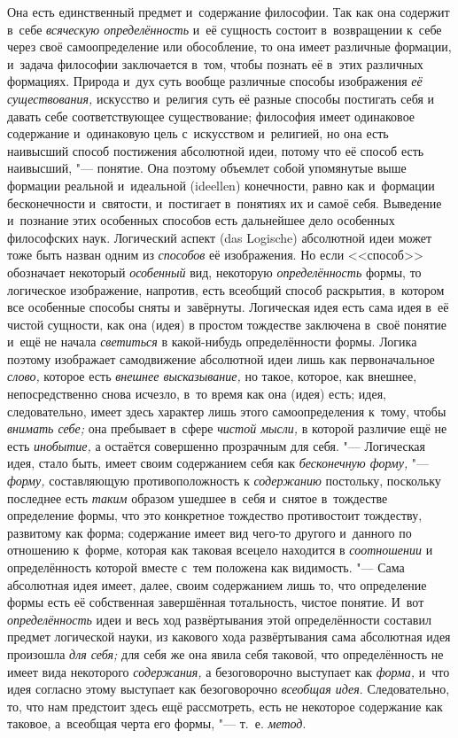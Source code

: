 Она есть единственный предмет и~содержание философии. Так как
она содержит в~себе {\em всяческую
определённость} и~её сущность состоит в~возвращении к~себе
через своё самоопределение или обособление, то она имеет различные
формации, и~задача философии заключается в~том, чтобы познать её в~этих
различных формациях. Природа и~дух суть вообще различные способы
изображения {\em её существования,}
искусство и~религия суть её разные способы постигать себя и
давать себе соответствующее существование; философия имеет одинаковое
содержание и~одинаковую цель с~искусством и~религией, но она
есть наивысший способ постижения абсолютной идеи, потому что её способ есть
наивысший, "--- понятие. Она поэтому объемлет собой упомянутые
выше формации реальной и~идеальной (ideellen) конечности,
равно как и~формации бесконечности и~святости, и~постигает в~понятиях их и
самоё себя. Выведение и~познание этих особенных способов есть дальнейшее
дело особенных философских наук. Логический аспект (das Logische)
абсолютной идеи может тоже быть назван одним из
{\em способов} её
изображения. Но если <<способ>> обозначает некоторый
{\em особенный} вид,
некоторую {\em определённость}
формы, то логическое изображение, напротив, есть всеобщий
способ раскрытия, в~котором все особенные способы сняты и~завёрнуты.
Логическая идея есть сама идея в~её чистой сущности, как она (идея) в
простом тождестве заключена в~своё понятие и~ещё не начала
{\em светиться} в
какой-нибудь определённости формы. Логика поэтому изображает самодвижение
абсолютной идеи лишь как первоначальное
{\em слово,} которое есть
{\em внешнее высказывание,}
но такое, которое, как внешнее, непосредственно снова
исчезло, в~то время как она (идея) есть; идея, следовательно, имеет здесь
характер лишь этого самоопределения к~тому, чтобы
{\em внимать себе;} она
пребывает в~сфере {\em чистой мысли,}
в которой различие ещё не есть
{\em инобытие,} а
остаётся совершенно прозрачным для себя. "--- Логическая идея,
стало быть, имеет своим содержанием себя как
{\em бесконечную форму,} "---
{\em форму,} составляющую
противоположность к {\em содержанию}
постольку, поскольку последнее есть
{\em таким} образом
ушедшее в~себя и~снятое в~тождестве определение формы, что это конкретное
тождество противостоит тождеству, развитому как форма; содержание имеет вид
чего-то другого и~данного по отношению к~форме, которая как таковая всецело
находится в {\em соотношении}
и определённость которой вместе с~тем положена как
видимость. "--- Сама абсолютная идея имеет, далее, своим
содержанием лишь то, что определение формы есть её собственная завершённая
тотальность, чистое понятие. И~вот
{\em определённость} идеи
и весь ход развёртывания этой определённости составил предмет логической
науки, из какового хода развёртывания сама абсолютная идея произошла
{\em для себя;} для себя
же она явила себя таковой, что определённость не имеет вида некоторого
{\em содержания,} а
безоговорочно выступает как
{\em форма,} и~что идея
согласно этому выступает как безоговорочно
{\em всеобщая идея}.
Следовательно, то, что нам предстоит здесь ещё рассмотреть,
есть не некоторое содержание как таковое, а~всеобщая черта его формы, "---
т.~е. {\em метод}.


